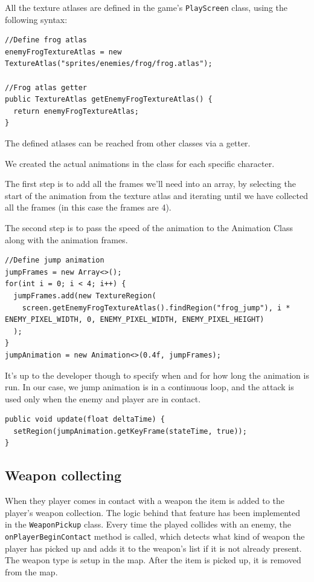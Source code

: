 \documentclass[12p]{article}
\begin{document}
All the texture atlases are defined in the game's \texttt{PlayScreen} class, using the following syntax:

\begin{verbatim}
//Define frog atlas
enemyFrogTextureAtlas = new TextureAtlas("sprites/enemies/frog/frog.atlas");

//Frog atlas getter
public TextureAtlas getEnemyFrogTextureAtlas() {
  return enemyFrogTextureAtlas;
}
\end{verbatim}

The defined atlases can be reached from other classes via a getter.

We created the actual animations in the class for each specific character. 

The first step is to add all the frames we'll need into an array, by selecting the start of the animation from the texture atlas and iterating until we have collected all the frames (in this case the frames are 4).

The second step is to pass the speed of the animation to the Animation Class along with the animation frames.

\begin{verbatim}
//Define jump animation
jumpFrames = new Array<>();
for(int i = 0; i < 4; i++) {
  jumpFrames.add(new TextureRegion(
    screen.getEnemyFrogTextureAtlas().findRegion("frog_jump"), i * ENEMY_PIXEL_WIDTH, 0, ENEMY_PIXEL_WIDTH, ENEMY_PIXEL_HEIGHT)
  );
}
jumpAnimation = new Animation<>(0.4f, jumpFrames);
\end{verbatim}

It's up to the developer though to specify when and for how long the animation is run. In our case, we jump animation is in a continuous loop, and the attack is used only when the enemy and player are in contact.

\begin{verbatim}
public void update(float deltaTime) {
  setRegion(jumpAnimation.getKeyFrame(stateTime, true));
}
\end{verbatim}


\subsection{Weapon collecting} \label{DocWeaponCollection}

When they player comes in contact with a weapon the item is added to the player's weapon collection. The logic behind that feature has been implemented in the \texttt{WeaponPickup} class. Every time the played collides with an enemy, the \texttt{onPlayerBeginContact} method is called, which detects what kind of weapon the player has picked up and adds it to the weapon's list if it is not already present. The weapon type is setup in the map. After the item is picked up, it is removed from the map.
\end{document}
